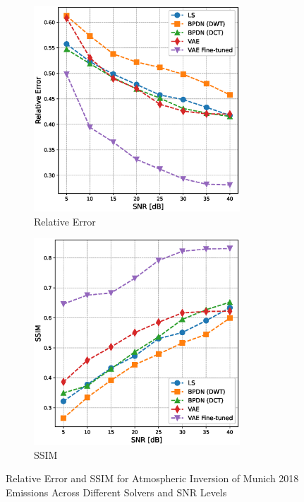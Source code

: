 \begin{figure}[htb]
    \centering
    \begin{subfigure}[b]{0.49\textwidth}
        \centering
        \includegraphics[width=0.85\textwidth]{figures/06_results/snr_plots/munich_relative_error.eps}
        \caption{Relative Error}
        \label{subfig:munich_results_relative_error}
    \end{subfigure}
    \begin{subfigure}[b]{0.49\textwidth}
        \centering
        \includegraphics[width=0.85\textwidth]{figures/06_results/snr_plots/munich_ssim.eps}
        \caption{SSIM}
    \end{subfigure}
    \caption{Relative Error and SSIM for Atmospheric Inversion of Munich 2018 Emissions Across Different Solvers and SNR Levels}
    \label{fig:munich_results}
\end{figure}

